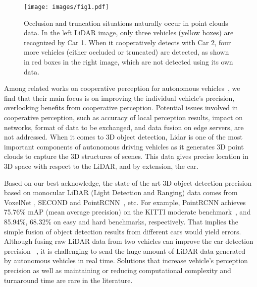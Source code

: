\documentclass[sigconf]{acmart}
\begin{document}
\begin{figure}[!t]
    \centering
    \texttt{[image: images/fig1.pdf]}
    \caption{Occlusion and truncation situations naturally occur in point clouds data. In the left LiDAR image,  only three vehicles (yellow boxes) are recognized by Car 1. When it cooperatively detects with Car 2, four more vehicles (either occluded or truncated) are detected, as shown in red boxes in the right image, which are not detected using its own data.}\vspace{-20pt}
    \label{fig:acclusion}
\end{figure}



Among related works on cooperative perception for autonomous vehicles~\cite{rauch2012car2x,cho2014multi}, we find that their main focus is on improving the individual vehicle's precision, overlooking benefits from cooperative perception. Potential issues involved in cooperative perception, such as accuracy of local perception results, impact on networks, format of data to be exchanged, and data fusion on edge servers, are not addressed. 
When it comes to 3D object detection, Lidar is one of the most important components of autonomous driving vehicles as it generates 3D point clouds to capture the 3D structures of scenes. This data gives precise location in 3D space with respect to the LiDAR, and by extension, the car. 

Based on our best acknowledge, the state of the art 3D object detection precision based on monocular LiDAR (Light Detection and Ranging) data comes from VoxelNet \cite{zhou2018voxelnet}, SECOND \cite{yan2018second} and PointRCNN~\cite{shi2018pointrcnn}, etc. For example, PointRCNN achieves 75.76\% mAP (mean average precision) on the KITTI moderate benchmark~\cite{geiger2012we}, and 85.94\%, 68.32\% on easy and hard benchmarks, respectively.
That implies the simple fusion of object detection results from different cars would yield errors.
Although fusing raw LiDAR data from two vehicles can improve the car detection precision ~\cite{qi2019cooper}, it is challenging to send the huge amount of LiDAR data generated by autonomous vehicles in real time.
Solutions that increase vehicle's perception precision as well as maintaining or reducing computational complexity and turnaround time are rare in the literature. 
\end{document}

